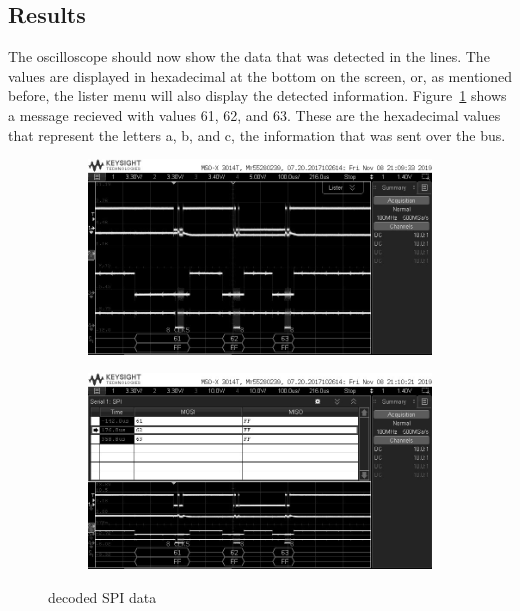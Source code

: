 \documentclass{article}
\begin{document}
  \subsection{Results}

  The oscilloscope should now show the data that was detected in the lines. The
  values are displayed in hexadecimal at the bottom on the screen, or, as
  mentioned before, the lister menu will also display the detected information.
  Figure~\ref{fig:spi_bus} shows a message recieved with values 61, 62, and 63.
  These are the hexadecimal values that represent the letters a, b, and c, the
  information that was sent over the bus.

  \begin{figure}[ht]
    \begin{subfigure}[b]{0.5\textwidth}
      \includegraphics[width=\linewidth]{images/spi/spi_bus.jpg}
      \caption{}
    \end{subfigure}
    \begin{subfigure}[b]{0.5\textwidth}
      \includegraphics[width=\linewidth]{images/spi/spi_bus_lister.jpg}
      \caption{}
    \end{subfigure}
    \caption{decoded SPI data}
    \label{fig:spi_bus}
  \end{figure}
\end{document}
